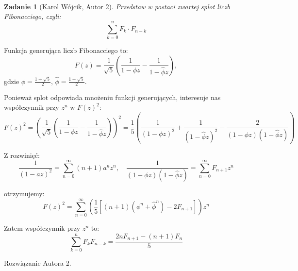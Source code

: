 \documentclass{mwart}
\newtheorem{zad}{Zadanie}[section]
\begin{document}
\begin{zad}[Karol Wójcik, Autor 2]
    Przedstaw w postaci zwartej splot liczb Fibonacciego, czyli:
    \[\sum_{k=0}^{n}F_k\cdot F_{n-k}\]
\end{zad}
\begin{mdframed}
    Funkcja generująca liczb Fibonacciego to:
\[
F(z) = \frac{1}{\sqrt{5}} \left( \frac{1}{1 - \phi z} - \frac{1}{1 - \hat{\phi} z} \right),
\]
gdzie \( \phi = \frac{1 + \sqrt{5}}{2} \), \( \hat{\phi} = \frac{1 - \sqrt{5}}{2} \).

Ponieważ splot odpowiada mnożeniu funkcji generujących, interesuje nas współczynnik przy \( z^n \) w \( F(z)^2 \):
\[
F(z)^2 = \left( \frac{1}{\sqrt{5}} \left( \frac{1}{1 - \phi z} - \frac{1}{1 - \hat{\phi} z} \right) \right)^2 = \frac{1}{5} \left( \frac{1}{(1 - \phi z)^2} + \frac{1}{(1 - \hat{\phi} z)^2} - \frac{2}{(1 - \phi z)(1 - \hat{\phi} z)} \right)
\]

Z rozwinięć:
\[
\frac{1}{(1 - az)^2} = \sum_{n=0}^\infty (n + 1) a^n z^n, \quad \frac{1}{(1 - \phi z)(1 - \hat{\phi} z)} = \sum_{n=0}^\infty F_{n+1} z^n
\]

otrzymujemy:
\[
F(z)^2 = \sum_{n=0}^\infty \left( \frac{1}{5} \left[ (n+1)(\phi^n + \hat{\phi}^n) - 2F_{n+1} \right] \right) z^n
\]

Zatem współczynnik przy \( z^n \) to:
\[
\sum_{k=0}^{n} F_k F_{n-k} = \frac{2n F_{n+1} - (n+1) F_n}{5}
\]

\end{mdframed}
\begin{mdframed}
    Rozwiązanie Autora 2.
\end{mdframed}


















\newpage
\end{document}
